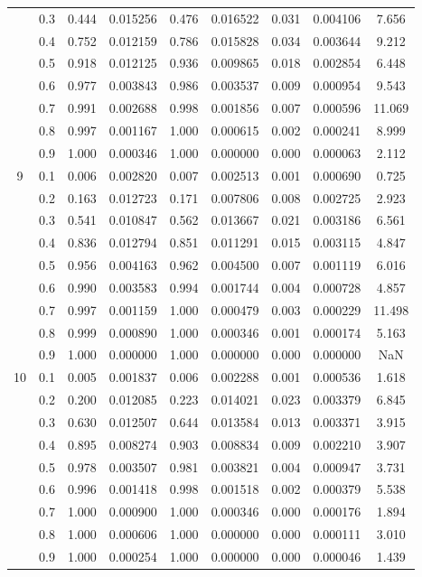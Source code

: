 \begin{longtable}{ | c | c || c | c | c | c | c | c | c | }
 & 0.3 & 0.444 & 0.015256 & 0.476 & 0.016522 & 0.031 & 0.004106 & 7.656 \\
 & 0.4 & 0.752 & 0.012159 & 0.786 & 0.015828 & 0.034 & 0.003644 & 9.212 \\
 & 0.5 & 0.918 & 0.012125 & 0.936 & 0.009865 & 0.018 & 0.002854 & 6.448 \\
 & 0.6 & 0.977 & 0.003843 & 0.986 & 0.003537 & 0.009 & 0.000954 & 9.543 \\
 & 0.7 & 0.991 & 0.002688 & 0.998 & 0.001856 & 0.007 & 0.000596 & 11.069 \\
 & 0.8 & 0.997 & 0.001167 & 1.000 & 0.000615 & 0.002 & 0.000241 & 8.999 \\
 & 0.9 & 1.000 & 0.000346 & 1.000 & 0.000000 & 0.000 & 0.000063 & 2.112 \\
 \hline
\multirow{9}{*}{9} & 0.1 & 0.006 & 0.002820 & 0.007 & 0.002513 & 0.001 & 0.000690 & 0.725 \\
 & 0.2 & 0.163 & 0.012723 & 0.171 & 0.007806 & 0.008 & 0.002725 & 2.923 \\
 & 0.3 & 0.541 & 0.010847 & 0.562 & 0.013667 & 0.021 & 0.003186 & 6.561 \\
 & 0.4 & 0.836 & 0.012794 & 0.851 & 0.011291 & 0.015 & 0.003115 & 4.847 \\
 & 0.5 & 0.956 & 0.004163 & 0.962 & 0.004500 & 0.007 & 0.001119 & 6.016 \\
 & 0.6 & 0.990 & 0.003583 & 0.994 & 0.001744 & 0.004 & 0.000728 & 4.857 \\
 & 0.7 & 0.997 & 0.001159 & 1.000 & 0.000479 & 0.003 & 0.000229 & 11.498 \\
 & 0.8 & 0.999 & 0.000890 & 1.000 & 0.000346 & 0.001 & 0.000174 & 5.163 \\
 & 0.9 & 1.000 & 0.000000 & 1.000 & 0.000000 & 0.000 & 0.000000 & NaN \\
 \hline
\multirow{9}{*}{10} & 0.1 & 0.005 & 0.001837 & 0.006 & 0.002288 & 0.001 & 0.000536 & 1.618 \\
 & 0.2 & 0.200 & 0.012085 & 0.223 & 0.014021 & 0.023 & 0.003379 & 6.845 \\
 & 0.3 & 0.630 & 0.012507 & 0.644 & 0.013584 & 0.013 & 0.003371 & 3.915 \\
 & 0.4 & 0.895 & 0.008274 & 0.903 & 0.008834 & 0.009 & 0.002210 & 3.907 \\
 & 0.5 & 0.978 & 0.003507 & 0.981 & 0.003821 & 0.004 & 0.000947 & 3.731 \\
 & 0.6 & 0.996 & 0.001418 & 0.998 & 0.001518 & 0.002 & 0.000379 & 5.538 \\
 & 0.7 & 1.000 & 0.000900 & 1.000 & 0.000346 & 0.000 & 0.000176 & 1.894 \\
 & 0.8 & 1.000 & 0.000606 & 1.000 & 0.000000 & 0.000 & 0.000111 & 3.010 \\
 & 0.9 & 1.000 & 0.000254 & 1.000 & 0.000000 & 0.000 & 0.000046 & 1.439 \\
 \hline
\hline
\end{longtable}
 
